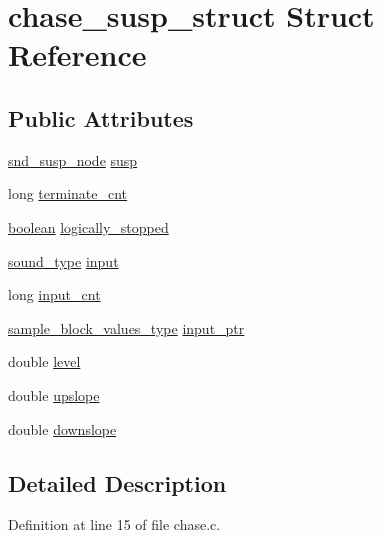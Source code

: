 \hypertarget{structchase__susp__struct}{}\section{chase\+\_\+susp\+\_\+struct Struct Reference}
\label{structchase__susp__struct}
\subsection*{Public Attributes}
\begin{DoxyCompactItemize}
\item 
\hyperlink{sound_8h_a6b268203688a934bd798ceb55f85d4c0}{snd\+\_\+susp\+\_\+node} \hyperlink{structchase__susp__struct_a511c23fb4db2768ba1645245f142bea0}{susp}
\item 
long \hyperlink{structchase__susp__struct_a2d76ff8d509df268cc204800ed5e5e63}{terminate\+\_\+cnt}
\item 
\hyperlink{cext_8h_a7670a4e8a07d9ebb00411948b0bbf86d}{boolean} \hyperlink{structchase__susp__struct_a4a108829cac873ae43abe54fb908d435}{logically\+\_\+stopped}
\item 
\hyperlink{sound_8h_a792cec4ed9d6d636d342d9365ba265ea}{sound\+\_\+type} \hyperlink{structchase__susp__struct_a41d177ed777f1cc0494127c2bce4cb38}{input}
\item 
long \hyperlink{structchase__susp__struct_ab8642a9980a098f2d80bd18f573b71d2}{input\+\_\+cnt}
\item 
\hyperlink{sound_8h_a83d17f7b465d1591f27cd28fc5eb8a03}{sample\+\_\+block\+\_\+values\+\_\+type} \hyperlink{structchase__susp__struct_a1b2512903a8579d8b1aa07ce6400b570}{input\+\_\+ptr}
\item 
double \hyperlink{structchase__susp__struct_ad5e4cbfa7a7cd17bd41fb7fa50c70836}{level}
\item 
double \hyperlink{structchase__susp__struct_aca2af28755fbd7043cdbb3a3dec4b67b}{upslope}
\item 
double \hyperlink{structchase__susp__struct_a6d618e4bad4c99f09364451fa85853e8}{downslope}
\end{DoxyCompactItemize}


\subsection{Detailed Description}


Definition at line 15 of file chase.\+c.



